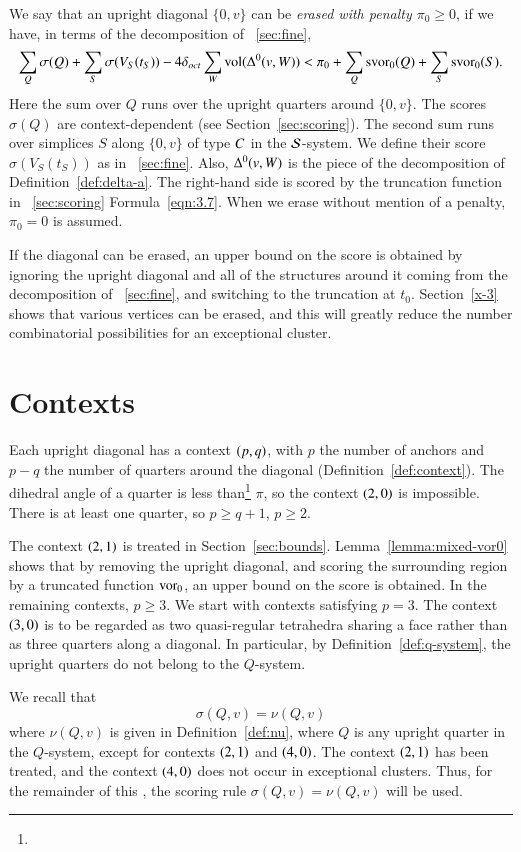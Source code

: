 We say that an upright diagonal $\{0,v\}$ can be {\it erased with
penalty $\pi_0\ge0$}, if we have, in terms of the  decomposition
of \Chap~\ref{sec:fine},
    $$
    \sum_Q\sigma(Q) +\sum_S\sigma(V_S(t_S)) - 4\delta_{oct}\sum_W{\operatorname{vol}}(\Delta^0(v,W))<
        \pi_0+\sum_Q\operatorname{svor}_0(Q) +\sum_S\operatorname{svor}_0(S).
    $$
Here the sum over $Q$ runs over the upright quarters around
$\{0,v\}$. The scores $\sigma(Q)$ are context-dependent (see
Section~\ref{sec:scoring}). The second sum runs over simplices $S$
along $\{0,v\}$ of type $C$ in the ${\mathcal S}$-system.  We define
their score $\sigma(V_S(t_S))$ as in \Chap~\ref{sec:fine}. Also,
$\Delta^0(v,W)$ is the piece of the decomposition of Definition~\ref{def:delta-a}. 
The right-hand side is scored by the
truncation function in \Chap~\ref{sec:scoring}
Formula~\ref{eqn:3.7}. When we erase without mention of a penalty,
$\pi_0=0$ is assumed.

If the diagonal can be erased, an upper bound on the score is
obtained by ignoring the upright diagonal and all of the
structures around it coming from the decomposition of
\Chap~\ref{sec:fine}, and switching to the truncation at $t_0$.
Section~\ref{x-3} shows that various vertices can be erased, and
this will greatly reduce the number combinatorial possibilities
for an exceptional cluster.

\section{Contexts} %

Each upright diagonal has a context $\relax(p,q)$, with $p$ the number
of anchors and $p-q$ the number of quarters around the diagonal
(Definition~\ref{def:context}). The dihedral angle of a quarter is
less than\footnote{} $\pi$, so the context
$\relax(2,0)$ is impossible. There is at least one quarter, so $p\ge
q+1$, $p\ge2$.

The context $\relax(2,1)$ is treated in Section~\ref{sec:bounds}.
Lemma~\ref{lemma:mixed-vor0} shows that by removing the upright
diagonal, and scoring the surrounding region by a truncated
function $\operatorname{vor}_0$, an upper bound on the score is obtained. In the
remaining contexts, $p\ge3$. We start with contexts satisfying
$p=3$. The context $\relax(3,0)$ is to be regarded as two
quasi-regular tetrahedra sharing a face rather than as three
quarters along a diagonal.  In particular, by
Definition~\ref{def:q-system}, the upright quarters do not belong
to the $Q$-system.

We recall that 
$$\sigma(Q,v)=\nu(Q,v)$$
where $\nu(Q,v)$ is given in Definition~\ref{def:nu},
where $Q$ is any upright quarter in the $Q$-system, except for
contexts $\relax(2,1)$ and $\relax(4,0)$.
The
context $\relax(2,1)$ has been treated, and the context $\relax(4,0)$ does
not occur in exceptional clusters. Thus, for the remainder of this
\chap, the scoring rule $\sigma(Q,v)=\nu(Q,v)$ will be used.



